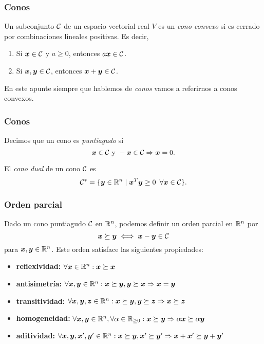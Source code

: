 \documentclass[aspectratio=169,12pt,spanish]{beamer}
\begin{document}

\begin{frame}
\frametitle{Conos}


Un subconjunto $\mathcal{C}$ de un espacio vectorial real $V$ es un \emph{cono convexo} si es cerrado por combinaciones lineales positivas. Es decir,
\begin{enumerate}
\item Si $\bm{x} \in \mathcal{C}$ y $a \ge 0$, entonces $a\bm{x} \in \mathcal{C}$.
\item Si $\bm{x}, \bm{y} \in \mathcal{C}$, entonces $\bm{x} + \bm{y} \in \mathcal{C}$.
\end{enumerate}

En este apunte siempre que hablemos de \emph{conos} vamos a referirnos a conos convexos.

\end{frame}


\begin{frame}
\frametitle{Conos}

Decimos que un cono es \emph{puntiagudo} si
$$
\bm{x}  \in \mathcal{C} \text{ y } -\bm{x} \in \mathcal{C} \Rightarrow \bm{x} = 0.
$$

El \emph{cono dual} de un cono $\mathcal{C}$ es
$$
\mathcal{C}^* = \{\bm{y} \in \mathbb{R}^n \mid \bm{x}^T \bm{y} \ge 0 \enspace \forall \bm{x} \in \mathcal{C}\}.
$$

\end{frame}


\begin{frame}
\frametitle{Orden parcial}

Dado un cono puntiagudo $\mathcal{C}$ en $\mathbb{R}^n$, podemos definir un orden parcial en $\mathbb{R}^n$ por
$$
\bm{x} \succeq \bm{y} \iff \bm{x} - \bm{y} \in \mathcal{C}
$$
para $\bm{x}, \bm{y} \in \mathbb{R}^n$. Este orden satisface las siguientes propiedades:
\begin{itemize}
\item \textbf{reflexividad:} $\forall \bm{x} \in \mathbb{R}^n: \bm{x} \succeq \bm{x}$
\item \textbf{antisimetría:} $\forall \bm{x}, \bm{y} \in \mathbb{R}^n: \bm{x} \succeq \bm{y}, \bm{y} \succeq \bm{x} \Rightarrow \bm{x} = \bm{y}$
\item \textbf{transitividad:} $\forall \bm{x}, \bm{y}, \bm{z} \in \mathbb{R}^n: \bm{x} \succeq \bm{y}, \bm{y} \succeq \bm{z} \Rightarrow \bm{x} \succeq \bm{z}$
\item \textbf{homogeneidad:} $\forall \bm{x}, \bm{y} \in \mathbb{R}^n, \forall \alpha \in \mathbb{R}_{\ge 0}: \bm{x} \succeq \bm{y} \Rightarrow \alpha \bm{x} \succeq \alpha \bm{y}$
\item \textbf{aditividad:} $\forall \bm{x}, \bm{y}, \bm{x}', \bm{y}' \in \mathbb{R}^n: \bm{x} \succeq \bm{y}, \bm{x}' \succeq \bm{y}' \Rightarrow \bm{x} + \bm{x}' \succeq \bm{y} + \bm{y}'$
\end{itemize}

\end{frame}
\end{document}
